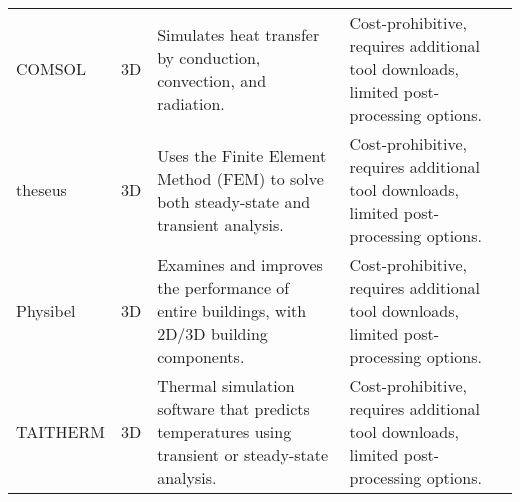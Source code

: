 \begin{table}[htb]
\begin{tabular}{p{2cm}p{1cm}p{5.5cm}p{5.5cm}}
        COMSOL     & 3D    & Simulates heat transfer by conduction, convection, and radiation.  & Cost-prohibitive, requires additional tool downloads, limited post-processing options. \cite{COMSOL} \\
        
        theseus    & 3D    & Uses the Finite Element Method (FEM) to solve both steady-state and transient analysis.  & Cost-prohibitive, requires additional tool downloads, limited post-processing options. \cite{thes} \\
        
        Physibel   & 3D    & Examines and improves the performance of entire buildings, with 2D/3D building components.  & Cost-prohibitive, requires additional tool downloads, limited post-processing options. \cite{phys} \\
        
        TAITHERM   & 3D    & Thermal simulation software that predicts temperatures using transient or steady-state analysis.  & Cost-prohibitive, requires additional tool downloads, limited post-processing options. \cite{taitherm} \\
        
        \bottomrule
    \end{tabular}
\end{table}












